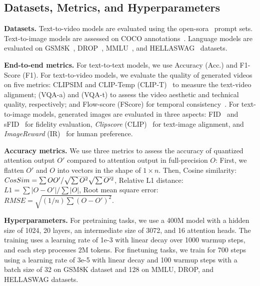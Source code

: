 \subsection{Datasets, Metrics, and Hyperparameters}  \label{sec:exp_dataset_metrics}
\noindent \noindent\textbf{Datasets.}   
Text-to-video models are evaluated using the open-sora~\citep{opensora} prompt sets.
Text-to-image models are assessed on COCO annotations~\citep{lin2014microsoft}.
Language models are evaluated on GSM8K~\citep{cobbe2021gsm8k}, DROP~\citep{Dua2019DROP}, MMLU~\citep{MMLU}, and HELLASWAG~\citep{zellers2019hellaswag} datasets.


\noindent \noindent\textbf{End-to-end metrics.}   
For text-to-text models, we use Accuracy (Acc.) and F1-Score (F1).
For text-to-video models, we evaluate the quality of generated videos on five metrics: CLIPSIM and CLIP-Temp (CLIP-T)~\cite{liu2024evalcrafter} to measure the text-video alignment; (VQA-a) and (VQA-t) to assess the video aesthetic and technical quality, respectively; and Flow-score (FScore) for temporal consistency~\cite{wu2023exploring}. 
For text-to-image models, generated images are evaluated in three aspects: FID~\cite{heusel2017gans} and sFID~\cite{salimans2016improved} for fidelity evaluation, \textit{Clipscore} (CLIP)~\cite{hessel2021clipscore} for text-image alignment, and \textit{ImageReward} (IR)~\cite{xu2024imagereward} for human preference.

\noindent\textbf{Accuracy metrics.} We use three metrics to assess the accuracy of quantized attention output $O'$ compared to attention output in full-precision $O$: First, we flatten $O'$ and $O$ into vectors in the shape of $1\times n$. Then, Cosine similarity: $CosSim=\sum OO' / \smash{\sqrt{\sum O^2}} \smash{\sqrt{\sum O'^2}}$, Relative L1 distance: $L1=\sum |O - O'| / \sum |O|$, Root mean square error: $RMSE=\sqrt{(1/n) \sum (O - O')^2}$.

\textbf{Hyperparameters.} 
For pretraining tasks, we use a 400M model with a hidden size of 1024, 20 layers, an intermediate size of 3072, and 16 attention heads. The training uses a learning rate of 1e-3 with linear decay over 1000 warmup steps, and each step processes 2M tokens.
For finetuning tasks, we train for 700 steps using a learning rate of 3e-5 with linear decay and 100 warmup steps with a batch size of 32 on GSM8K dataset and 128 on MMLU, DROP, and HELLASWAG datasets.

